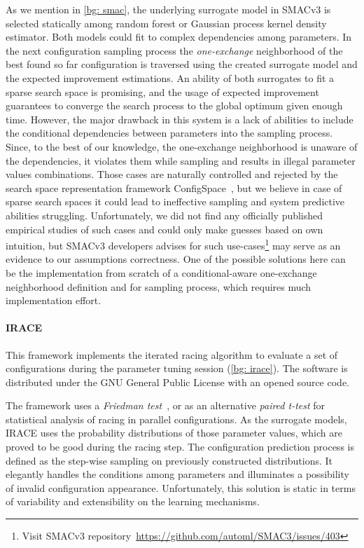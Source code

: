 As we mention in \cref{bg: smac}, the underlying surrogate model in SMACv3 is selected statically among random forest or Gaussian process kernel density estimator. Both models could fit to complex dependencies among parameters. In the next configuration sampling process the \emph{one-exchange} neighborhood of the best found so far configuration is traversed using the created surrogate model and the expected improvement estimations. An ability of both surrogates to fit a sparse search space is promising, and the usage of expected improvement guarantees to converge the search process to the global optimum given enough time. However, the major drawback in this system is a lack of abilities to include the conditional dependencies between parameters into the sampling process. Since, to the best of our knowledge, the one-exchange neighborhood is unaware of the dependencies, it violates them while sampling and results in illegal parameter values combinations. Those cases are naturally controlled and rejected by the search space representation framework ConfigSpace~\cite{configspace}, but we believe in case of sparse search spaces it could lead to ineffective sampling and system predictive abilities struggling. Unfortunately, we did not find any officially published empirical studies of such cases and could only make guesses based on own intuition, but SMACv3 developers advises for such use-cases\footnote{Visit SMACv3 repository~\url{https://github.com/automl/SMAC3/issues/403}} may serve as an evidence to our assumptions correctness. One of the possible solutions here can be the implementation from scratch of a conditional-aware one-exchange neighborhood definition and for sampling process, which requires much implementation effort.

\paragraph{IRACE} This framework implements the iterated racing algorithm to evaluate a set of configurations during the parameter tuning session (\cref{bg: irace}). The software is distributed under the GNU General Public License with an opened source code.

The framework uses a \emph{Friedman test}~\cite{conover1980practical}, or as an alternative \emph{paired t-test} for statistical analysis of racing in parallel configurations. As the surrogate models, IRACE uses the probability distributions of those parameter values, which are proved to be good during the racing step. The configuration prediction process is defined as the step-wise sampling on previously constructed distributions. It elegantly handles the conditions among parameters and illuminates a possibility of invalid configuration appearance. Unfortunately, this solution is static in terms of variability and extensibility on the learning mechanisms.

